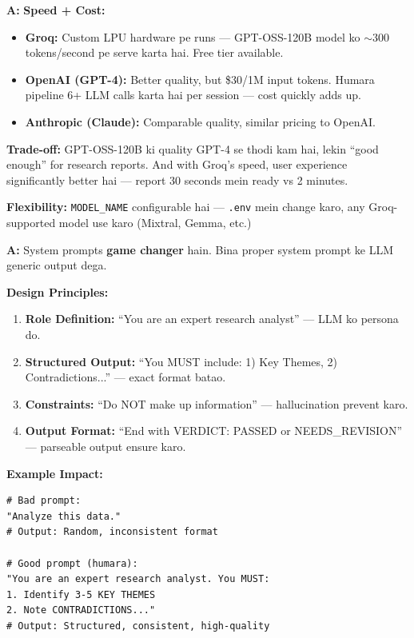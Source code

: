 \documentclass[12pt, a4paper]{article}
\begin{document}
\begin{interviewbox}[title={\faIcon{user-tie} ~Q7: Groq kyun use kiya? OpenAI ya Anthropic kyun nahi?}]
\textbf{A:} \textbf{Speed + Cost:}
\begin{itemize}
\item \textbf{Groq:} Custom LPU hardware pe runs --- GPT-OSS-120B model ko $\sim$300 tokens/second pe serve karta hai. Free tier available.
\item \textbf{OpenAI (GPT-4):} Better quality, but \$30/1M input tokens. Humara pipeline 6+ LLM calls karta hai per session --- cost quickly adds up.
\item \textbf{Anthropic (Claude):} Comparable quality, similar pricing to OpenAI.
\end{itemize}

\textbf{Trade-off:} GPT-OSS-120B ki quality GPT-4 se thodi kam hai, lekin ``good enough'' for research reports. And with Groq's speed, user experience significantly better hai --- report 30 seconds mein ready vs 2 minutes.

\textbf{Flexibility:} \texttt{MODEL\_NAME} configurable hai --- \texttt{.env} mein change karo, any Groq-supported model use karo (Mixtral, Gemma, etc.)
\end{interviewbox}

\begin{interviewbox}[title={\faIcon{user-tie} ~Q8: System Prompts kitne important hain? Kaise design kiye?}]
\textbf{A:} System prompts \textbf{game changer} hain. Bina proper system prompt ke LLM generic output dega.

\textbf{Design Principles:}
\begin{enumerate}
\item \textbf{Role Definition:} ``You are an expert research analyst'' --- LLM ko persona do.
\item \textbf{Structured Output:} ``You MUST include: 1) Key Themes, 2) Contradictions...'' --- exact format batao.
\item \textbf{Constraints:} ``Do NOT make up information'' --- hallucination prevent karo.
\item \textbf{Output Format:} ``End with VERDICT: PASSED or NEEDS\_REVISION'' --- parseable output ensure karo.
\end{enumerate}

\textbf{Example Impact:}
\begin{lstlisting}[style=pythonstyle]
# Bad prompt:
"Analyze this data."
# Output: Random, inconsistent format

# Good prompt (humara):
"You are an expert research analyst. You MUST:
1. Identify 3-5 KEY THEMES
2. Note CONTRADICTIONS..."
# Output: Structured, consistent, high-quality
\end{lstlisting}
\end{interviewbox}
\end{document}
